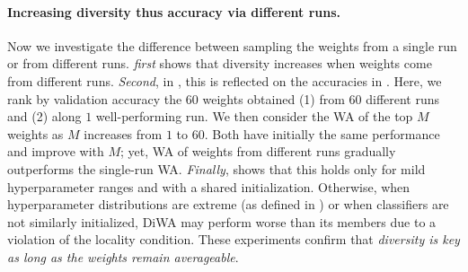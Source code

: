 \paragraph{Increasing diversity thus accuracy via different runs.}
Now we investigate the difference between sampling the weights from a single run or from different runs.
 \textit{first} shows that diversity increases when weights come from different runs.
\textit{Second}, in , this is reflected on the accuracies in \ood.
Here, we rank by validation accuracy the $60$ weights obtained (1) from $60$ different runs and (2) along $1$ well-performing run.
We then consider the WA of the top $M$ weights as $M$ increases from $1$ to $60$.
Both have initially the same performance and improve with $M$; yet,
WA of weights from different runs gradually outperforms the single-run WA.
\textit{Finally},  shows that this holds only for mild hyperparameter ranges and with a shared initialization.
Otherwise, when hyperparameter distributions are extreme (as defined in ) or when classifiers are not similarly initialized, DiWA may perform worse than its members due to a violation of the locality condition.
These experiments confirm that \textit{diversity is key as long as the weights remain averageable}.%
%